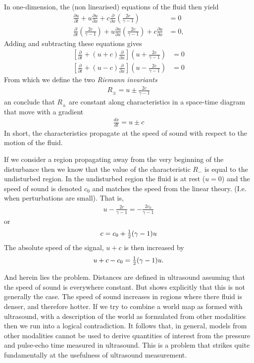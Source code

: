 In one-dimension, the (non linearised) equations of the fluid then yield
\begin{align}
 \frac{\partial u}{\partial t} + u \frac{\partial u}{\partial x} + c\frac{\partial }{\partial x}\left(\frac{2c}{\gamma - 1}\right)  &= 0  \label{eqn:euclidianNSRiemann}\\
 \frac{\partial }{\partial t} \left(\frac{2c}{\gamma - 1} \right)+ u \frac{\partial u}{\partial x} \left(\frac{2c}{\gamma - 1} \right) + c\frac{\partial u}{\partial x} &= 0,\label{eqn:euclidianContinuityRiemann}
\end{align}
Adding and subtracting these equations gives
\begin{align}
\left[ \frac{\partial }{\partial t} + (u + c) \frac{\partial }{\partial x} \right]\left(u + \frac{2c}{\gamma - 1} \right) &= 0 \\
\left[ \frac{\partial }{\partial t} + (u - c) \frac{\partial }{\partial x} \right]\left(u - \frac{2c}{\gamma - 1} \right) &= 0 
\end{align}
From which we define the two {\em Riemann invariants}
\begin{align}
R_\pm = u \pm \frac{2c}{\gamma - 1}
\end{align}
an conclude that $R_\pm$ are constant along characteristics in a space-time diagram that move with a gradient
\begin{align}
\frac{dx}{dt}= u\pm c
\end{align}
In short,
the characteristics propagate at the speed of sound with respect to the motion of the fluid.

If we consider a region propagating away from the very beginning of the disturbance then
we know that the value of the characteristic $R_-$ is equal to the undisturbed region.
In the undisturbed region the fluid is at rest ($u=0$) and the speed of sound is denoted $c_0$ and matches the speed from the linear theory.  (I.e. when perturbations are small). 
That is,
\begin{align}
  u - \frac{2c}{\gamma - 1} = - \frac{2c_0}{\gamma - 1}
\end{align}
or 
\begin{align}
 c = c_0  + \tfrac{1}{2} (\gamma -1) u
\end{align}
The absolute speed of the signal, $u +c$ is then increased by
\begin{align}
  u + c - c_0 =  \tfrac{1}{2} (\gamma -1) u.
\end{align}

And herein lies the problem.
Distances are defined in ultrasound assuming that the speed of sound is everywhere constant.
But \eqnref{} shows explicitly that this is not generally the case.
The speed of sound increases in regions where there fluid is denser, and therefore hotter.
If we try to combine a world map as formed with ultrasound, 
with a description of the world as formulated from other modalities then we run into a logical contradiction.
It follows that, in general, models from other modalities cannot be used to derive quantities of interest from the 
pressure and pulse-echo time measured in ultrasound.
This is a problem that strikes quite fundamentally at the usefulness of ultrasound measurement.

